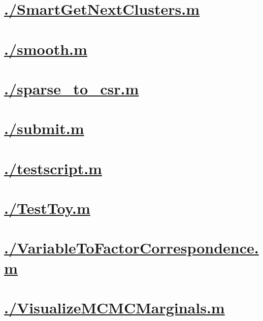 \documentclass{article}
\begin{document}
    \section{\hyperref[toc]{./SmartGetNextClusters.m}}
        \newpage
    \section{\hyperref[toc]{./smooth.m}}
        \newpage
    \section{\hyperref[toc]{./sparse\_to\_csr.m}}
        \newpage
    \section{\hyperref[toc]{./submit.m}}
        \newpage
    \section{\hyperref[toc]{./testscript.m}}
        \newpage
    \section{\hyperref[toc]{./TestToy.m}}
        \newpage
    \section{\hyperref[toc]{./VariableToFactorCorrespondence.m}}
        \newpage
    \section{\hyperref[toc]{./VisualizeMCMCMarginals.m}}
        \newpage
\end{document}

